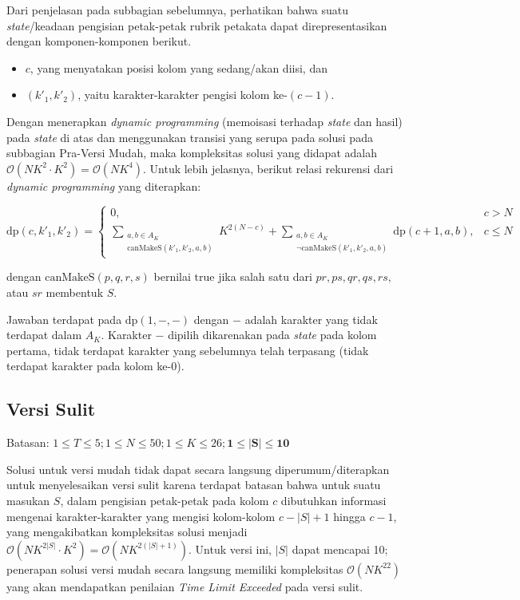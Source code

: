 \documentclass[../main_editorial.tex]{subfiles} %
\newcommand{\dpf}{\mathrm{dp}}
\newcommand{\mtrue}{\mathrm{true}}
\newcommand{\bigO}[1]{\mathcal{O}(#1)}
\begin{document}
Dari penjelasan pada subbagian sebelumnya, perhatikan bahwa suatu \textit{state}/keadaan pengisian petak-petak rubrik petakata dapat direpresentasikan dengan komponen-komponen berikut.

\begin{itemize}
\item $ c $, yang menyatakan posisi kolom yang sedang/akan diisi, dan
\item $ (k'_1, k'_2) $, yaitu karakter-karakter pengisi kolom ke-$ (c-1) $.
\end{itemize}

Dengan menerapkan \textit{dynamic programming} (memoisasi terhadap \textit{state} dan hasil) pada \textit{state} di atas dan menggunakan transisi yang serupa pada solusi pada subbagian Pra-Versi Mudah, maka kompleksitas solusi yang didapat adalah $ \bigO{NK^2 \cdot K^2} = \bigO{NK^4} $. Untuk lebih jelasnya, berikut relasi rekurensi dari \textit{dynamic programming} yang diterapkan:

$$
\dpf(c, k'_1, k'_2) = 
\begin{cases} 
	0, & c > N\\
	\displaystyle \sum_{\substack{a, b \in A_K\\\mathrm{canMakeS}(k'_1, k'_2, a, b)}} K^{2(N-c)} 
	+ \displaystyle \sum_{\substack{a, b \in A_K\\\lnot\mathrm{canMakeS}(k'_1, k'_2, a, b)}} \dpf(c + 1, a, b), & c \le N
\end{cases}
$$

dengan $ \mathrm{canMakeS}(p, q, r, s) $ bernilai $ \mtrue $ jika salah satu dari $ pr, ps, qr, qs, rs, $ atau $ sr $ membentuk $ S $.

Jawaban terdapat pada $ \dpf(1, -, -) $ dengan $ - $ adalah karakter yang tidak terdapat dalam $ A_K $. Karakter $ - $ dipilih dikarenakan pada \textit{state} pada kolom pertama, tidak terdapat karakter yang sebelumnya telah terpasang (tidak terdapat karakter pada kolom ke-$ 0 $).

\subsection*{Versi Sulit}

Batasan: $1 \le T \le 5; 1 \le N \le 50; 1 \le K \le 26; \mathbf{1 \le |S| \le 10}$

Solusi untuk versi mudah tidak dapat secara langsung diperumum/diterapkan untuk menyelesaikan versi sulit karena terdapat batasan bahwa untuk suatu masukan $ S $, dalam pengisian petak-petak pada kolom $ c $ dibutuhkan informasi mengenai karakter-karakter yang mengisi kolom-kolom $ c-|S|+1 $ hingga $ c-1 $, yang mengakibatkan kompleksitas solusi menjadi $ \bigO{NK^{2|S|} \cdot {K^2}} = \bigO{NK^{2(|S| + 1)}} $. Untuk versi ini, $ |S| $ dapat mencapai 10; penerapan solusi versi mudah secara langsung memiliki kompleksitas $ \bigO{NK^{22}} $ yang akan mendapatkan penilaian \textit{Time Limit Exceeded} pada versi sulit.
\end{document}
